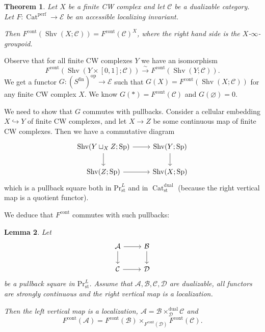 \documentclass[draft]{amsart}
\newcommand{\cat}[1]{\mathcal{#1}}
\renewcommand{\emptyset}{\varnothing}
\newcommand{\op}{\mathrm{op}}
\newcommand{\isoto}{\mathbin{\xrightarrow{\sim}}}
\newcommand{\injto}{\mathbin{\hookrightarrow}}
\renewcommand{\Pr}{\mathrm{Pr}}
\DeclareMathOperator{\Shv}{Shv}
\DeclareMathOperator{\Cat}{Cat}
\DeclareMathOperator{\Sp}{Sp}
\newtheorem{thm}{Theorem}[section]
\newtheorem{lem}[thm]{Lemma}
\theoremstyle{definition}
\begin{document}
\begin{thm}
Let $X$ be a finite CW complex and let $\cat C$ be a dualizable category. Let $F\colon \Cat^{\mathrm{perf}} \to \cat E$ be an accessible localizing invariant.

Then $F^{\mathrm{cont}}(\Shv(X;\cat C)) = F^{\mathrm{cont}}(\cat C)^X$, where the right hand side is the $X$-$\infty$-groupoid.
\end{thm}

Observe that for all finite CW complexes $Y$ we have an isomorphism
\[
F^{\mathrm{cont}}(\Shv(Y\times [0,1]; \cat C)) \isoto F^{\mathrm{cont}}(\Shv(Y; \cat C)).
\]
We get a functor $G\colon (S^{\mathrm{fin}})^\op \to \cat E$ such that $G(X) = F^{\mathrm{cont}}(\Shv(X;\cat C))$ for any finite CW complex $X$. We know $G(*) = F^{\mathrm{cont}}(\cat C)$ and $G(\emptyset) = 0$.

We need to show that $G$ commutes with pullbacks. Consider a cellular embedding $X\injto Y$ of finite CW complexes, and let $X\to Z$ be some continuous map of finite CW complexes. Then we have a commutative diagram
\[
\begin{tikzcd}
\Shv(Y\sqcup_XZ; \Sp) \ar[r]\ar[d] & \Shv(Y;\Sp) \ar[d] \\
\Shv(Z; \Sp) \ar[r] & \Shv(X;\Sp)
\end{tikzcd}
\]
which is a pullback square both in $\Pr^L_{\mathrm{st}}$ and in $\Cat^{\mathrm{dual}}_{\mathrm{st}}$ (because the right vertical map is a quotient functor).

We deduce that $F^{\mathrm{cont}}$ commutes with such pullbacks:

\begin{lem}
Let
\[
\begin{tikzcd}
\cat A \ar[d] \ar[r] & \cat B \ar[d] \\
\cat C \ar[r] & \cat D
\end{tikzcd}
\]
be a pullback square in $\Pr^L_{\mathrm{st}}$. Assume that $\cat A, \cat B, \cat C, \cat D$ are dualizable, all functors are strongly continuous and the right vertical map is a localization. 

Then the left vertical map is a localization, $\cat A = \cat B\times_{\cat D}^{\mathrm{dual}} \cat C$ and
\[
F^{\mathrm{cont}}(\cat A) = F^{\mathrm{cont}}(\cat B)\times_{F^{\mathrm{cont}}(\cat D)} F^{\mathrm{cont}}(\cat C).
\]
\end{lem}
\end{document}
